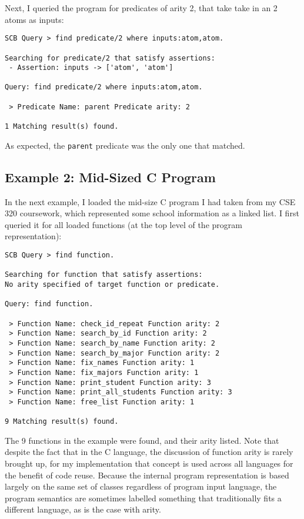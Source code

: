 \documentclass{article}
\begin{document}
Next, I queried the program for predicates of arity 2, that take take in an 2 atoms as inputs:

\begin{Verbatim}[frame=single]
SCB Query > find predicate/2 where inputs:atom,atom.

Searching for predicate/2 that satisfy assertions:
 - Assertion: inputs -> ['atom', 'atom']

Query: find predicate/2 where inputs:atom,atom.

 > Predicate Name: parent Predicate arity: 2

1 Matching result(s) found.
\end{Verbatim}

As expected, the \texttt{parent} predicate was the only one that matched.

\subsection{Example 2: Mid-Sized C Program}

In the next example, I loaded the mid-size C program I had taken from my CSE 320 coursework, which represented some school information as a linked list. I first queried it for all loaded functions (at the top level of the program representation):
\begin{Verbatim}[frame=single]
SCB Query > find function.

Searching for function that satisfy assertions:
No arity specified of target function or predicate.

Query: find function.

 > Function Name: check_id_repeat Function arity: 2
 > Function Name: search_by_id Function arity: 2
 > Function Name: search_by_name Function arity: 2
 > Function Name: search_by_major Function arity: 2
 > Function Name: fix_names Function arity: 1
 > Function Name: fix_majors Function arity: 1
 > Function Name: print_student Function arity: 3
 > Function Name: print_all_students Function arity: 3
 > Function Name: free_list Function arity: 1

9 Matching result(s) found.
\end{Verbatim}

The 9 functions in the example were found, and their arity listed. Note that despite the fact that in the C language, the discussion of function arity is rarely brought up, for my implementation that concept is used across all languages for the benefit of code reuse. Because the internal program representation is based largely on the same set of classes regardless of program input language, the program semantics are sometimes labelled something that traditionally fits a different language, as is the case with arity.
\end{document}
